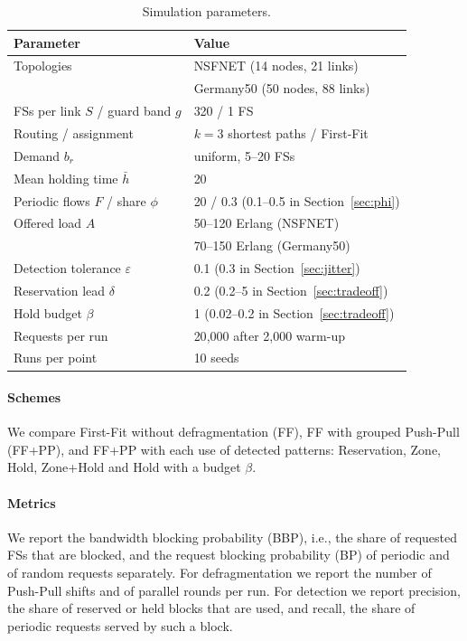 \documentclass[preprint,12pt]{elsarticle}
\begin{document}
\begin{table}[t]
\centering
\caption{Simulation parameters.}
\label{tab:params}
\small
\begin{tabular}{@{}ll@{}}
\toprule
Parameter & Value \\
\midrule
Topologies & NSFNET (14 nodes, 21 links) \\
 & Germany50 (50 nodes, 88 links) \\
FSs per link $S$ / guard band $g$ & 320 / 1 FS \\
Routing / assignment & $k=3$ shortest paths \cite{yen1971} / First-Fit \\
Demand $b_r$ & uniform, 5--20 FSs \\
Mean holding time $\bar{h}$ & 20 \\
Periodic flows $F$ / share $\phi$ & 20 / 0.3 (0.1--0.5 in Section~\ref{sec:phi}) \\
Offered load $A$ & 50--120 Erlang (NSFNET) \\
 & 70--150 Erlang (Germany50) \\
Detection tolerance $\varepsilon$ & 0.1 (0.3 in Section~\ref{sec:jitter}) \\
Reservation lead $\delta$ & 0.2 (0.2--5 in Section~\ref{sec:tradeoff}) \\
Hold budget $\beta$ & 1 (0.02--0.2 in Section~\ref{sec:tradeoff}) \\
Requests per run & 20{,}000 after 2{,}000 warm-up \\
Runs per point & 10 seeds \\
\bottomrule
\end{tabular}
\end{table}

\paragraph{Schemes} We compare First-Fit without defragmentation (FF), FF with grouped Push-Pull (FF+PP), and FF+PP with each use of detected patterns: Reservation, Zone, Hold, Zone+Hold and Hold with a budget $\beta$.

\paragraph{Metrics} We report the bandwidth blocking probability (BBP), i.e., the share of requested FSs that are blocked, and the request blocking probability (BP) of periodic and of random requests separately. For defragmentation we report the number of Push-Pull shifts and of parallel rounds per run. For detection we report precision, the share of reserved or held blocks that are used, and recall, the share of periodic requests served by such a block.
\end{document}

